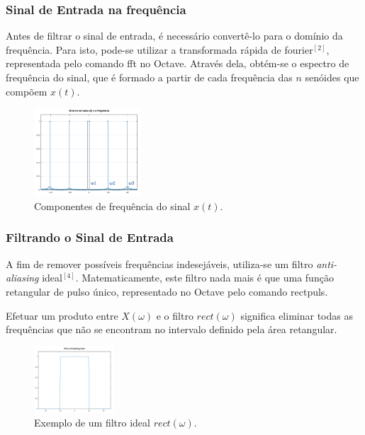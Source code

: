 \documentclass[]{IEEEtran}
\begin{document}
\subsubsection{Sinal de Entrada na frequência}

Antes de filtrar o sinal de entrada, é necessário convertê-lo para o domínio da frequência. Para isto, pode-se utilizar a transformada rápida de fourier$^{[2]}$, representada pelo comando {\selectfont fft} no Octave. Através dela, obtém-se o espectro de frequência do sinal, que é formado a partir de cada frequência das $n$ senóides que compõem $x(t)$.

\begin{figure}[H]
\captionsetup{justification=centering}
\centering %
\includegraphics[width=4cm]{ex_sinal_entrada_freq.png} %
\caption{Componentes de frequência do sinal $x(t)$.}
\end{figure}

\subsubsection{Filtrando o Sinal de Entrada}

A fim de remover possíveis frequências indesejáveis, utiliza-se um filtro \textit{anti-aliasing} ideal$^{[4]}$. Matematicamente, este filtro nada mais é que uma função retangular de pulso único, representado no Octave pelo comando {\selectfont rectpuls}. 

Efetuar um produto entre $X(\omega)$ e o filtro $rect(\omega)$ significa eliminar todas as frequências que não se encontram no intervalo definido pela área retangular. 

\begin{figure}[H]
\captionsetup{justification=centering}
\centering %
\includegraphics[width=3cm]{ex_filtro_aliasing.png} %
\caption{Exemplo de um filtro ideal $rect(\omega)$.}
\end{figure}
\end{document}
